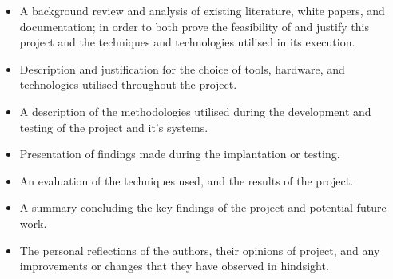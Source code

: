\begin{itemize}
\item A background review and analysis of existing literature, white papers, and
documentation; in order to both prove the feasibility of and justify this
project and the techniques and technologies utilised in its execution.

\item Description and justification for the choice of tools, hardware, and
technologies utilised throughout the project.

\item A description of the methodologies utilised during the
development and testing of the project and it's systems.

\item Presentation of findings made during the implantation or testing.

\item An evaluation of the techniques used, and the results of the project.

\item A summary concluding the key findings of the project and potential future
work.

\item The personal reflections of the authors, their opinions of project, and
any improvements or changes that they have observed in hindsight.
\end{itemize}

